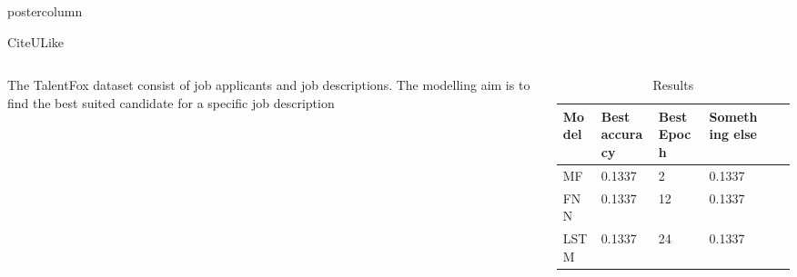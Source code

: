 \documentclass[final,hyperref={pdfpagelabels=false}]{beamer}
\newlength{\columnheight}
\begin{document}
\begin{frame}
\begin{columns}
\begin{column}{.49\paperwidth}
\begin{beamercolorbox}[center,wd=\textwidth]{postercolumn}
\begin{minipage}[T]{.99\textwidth} %
\parbox[t][\columnheight]{\textwidth}{ %
            



 \begin{block}{CiteULike}
 \begin{columns}
 \begin{column}{1\textwidth}



\centering
\begin{minipage}[t]{0.96\textwidth}
			

\hspace{0.5cm} 
\vspace{-1cm}
\begin{columns}
 \begin{column}{0.45\textwidth}
 \justifying
 \small{
	The TalentFox dataset consist of job applicants and job descriptions. The modelling aim is to find the best suited candidate for a specific job description }
 \end{column}
 \begin{column}{0.49\textwidth}

\begin{table}[h]
\small
\centering
\caption{Results} 
\label{res:TalentFox_results}
\begin{tabular}{llllll}
\toprule
Model  & Best accuracy        & Best Epoch     & Something else    \\
\midrule
MF  	&  0.1337        & 2       & 0.1337    \\
FNN	  &  0.1337        & 12      & 0.1337    \\
LSTM	&  0.1337        & 24      & 0.1337    \\
\bottomrule
\end{tabular}
\end{table}


\end{column}
\end{columns}
\end{minipage}
\end{column}
\end{columns}
\end{block}}
\end{minipage}
\end{beamercolorbox}
\end{column}
\end{columns}
\end{frame}
\end{document}
